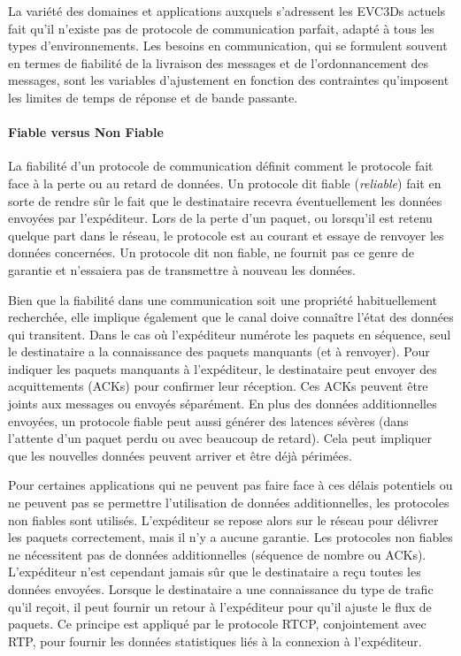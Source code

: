 La variété des domaines et applications auxquels s'adressent les 
\glspl{EVC3D} actuels fait qu'il n'existe pas de protocole de 
communication parfait, adapté à tous les types d'environnements. 
Les besoins en communication, qui se formulent souvent en termes de 
fiabilité de la livraison des messages et de l'ordonnancement des messages, sont 
les variables d'ajustement en fonction des contraintes qu'imposent les limites de 
temps de réponse et de bande passante.

\paragraph{Fiable versus Non Fiable}
\label{sec:fiabilite}
La fiabilité d'un protocole de communication définit comment le protocole fait face 
à la perte ou au retard de données. Un protocole dit \og fiable\fg{} (\textit{reliable}) 
fait en sorte de rendre sûr le fait que le destinataire recevra éventuellement les 
données envoyées par l'expéditeur. Lors de la perte d'un paquet, ou lorsqu'il est 
retenu quelque part dans le réseau, le protocole est au courant et essaye de 
renvoyer les données concernées. Un protocole dit \og non fiable\fg{}, ne fournit 
pas ce genre de garantie et n'essaiera pas de transmettre à nouveau les données.

Bien que la fiabilité dans une communication soit une propriété habituellement 
recherchée, elle implique également que le canal doive connaître l'état des données 
qui transitent. Dans le cas où l'expéditeur numérote les paquets en séquence, seul le destinataire a la connaissance des paquets manquants (et à 
renvoyer). Pour indiquer les paquets manquants à l'expéditeur, le destinataire peut 
envoyer des acquittements (ACKs) pour confirmer leur réception. Ces ACKs 
peuvent être joints aux messages ou envoyés séparément. En plus des données 
additionnelles envoyées, un protocole fiable peut aussi générer des latences 
sévères (dans l'attente d'un paquet perdu ou avec beaucoup de retard). Cela peut 
impliquer que les \og nouvelles\fg{} données peuvent arriver et être déjà 
périmées.

Pour certaines applications qui ne peuvent pas faire face à ces délais potentiels 
ou ne peuvent pas se permettre l'utilisation de données additionnelles, les protocoles non fiables 
sont utilisés. 
L'expéditeur se repose alors sur le réseau pour délivrer les paquets 
correctement, mais il n'y a aucune garantie. Les protocoles non fiables ne 
nécessitent pas de données additionnelles (séquence de nombre ou ACKs). 
L'expéditeur n'est cependant jamais sûr que le destinataire a reçu toutes les 
données envoyées. Lorsque le destinataire a une connaissance du type de trafic qu'il reçoit, 
il peut fournir un retour à l'expéditeur pour qu'il ajuste le flux de paquets. Ce 
principe est appliqué par le protocole \gls{RTCP}, conjointement avec \gls{RTP}, 
pour fournir les données statistiques liés à la  connexion à l'expéditeur.

